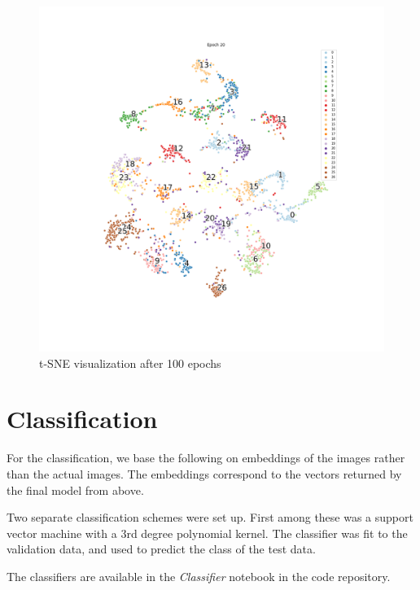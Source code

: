 \documentclass[10pt]{article}
\begin{document}
\begin{figure}
\includegraphics[scale=.45]{tsne/epoch_20.png}
\caption{t-SNE visualization after 100 epochs}
\end{figure}

\section{Classification}
For the classification, we base the following on embeddings of the images rather than the actual images. The embeddings correspond to the vectors returned by the final model from above.

Two separate classification schemes were set up. First among these was a support vector machine with a 3rd degree polynomial kernel. The classifier was fit to the validation data, and used to predict the class of the test data.

The classifiers are available in the \emph{Classifier} notebook in the code repository.
\end{document}
